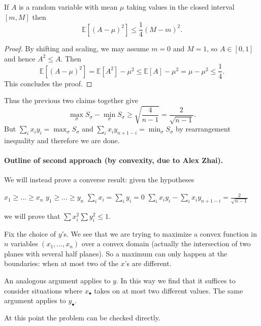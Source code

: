 \documentclass[11pt]{scrartcl}
\begin{document}

\begin{claim*}
  If $A$ is a random variable with mean $\mu$
  taking values in the closed interval $[m, M]$ then
  \[ \mathbb E[(A-\mu)^2] \le \frac14 (M-m)^2. \]
\end{claim*}
\begin{proof}
  By shifting and scaling, we may assume $m = 0$ and $M = 1$,
  so $A \in [0,1]$ and hence $A^2 \le A$.
  Then
  \[
    \mathbb E[(A-\mu)^2]
    = \mathbb E[A^2] - \mu^2
    \le \mathbb E[A] - \mu^2 = \mu-\mu^2 \le \frac14.
  \]
  This concludes the proof.
\end{proof}
Thus the previous two claims together give
\[ \max_\sigma S_\sigma - \min_\sigma S_\sigma
  \ge \sqrt{\frac{4}{n-1}} = \frac{2}{\sqrt{n-1}}.
\]
But $\sum_i x_i y_i = \max_\sigma S_\sigma$
and $\sum_i x_i y_{n+1-i} = \min_\sigma S_\sigma$
by rearrangement inequality
and therefore we are done.

\paragraph{Outline of second approach (by convexity, due to Alex Zhai).}
We will instead prove a converse result: given the hypotheses
\begin{itemize}
  \ii $x_1 \ge \dots \ge x_n$
  \ii $y_1 \ge \dots \ge y_n$
  \ii $\sum_i x_i = \sum_i y_i = 0$
  \ii $\sum_i x_i y_i - \sum_i x_i y_{n+1-i} = \frac{2}{\sqrt{n-1}}$
\end{itemize}
we will prove that $\sum x_i^2 \sum y_i^2 \le 1$.

Fix the choice of $y$'s.
We see that we are trying to maximize a convex function in $n$
variables $(x_1, \dots, x_n)$ over a convex domain
(actually the intersection of two planes with several half planes).
So a maximum can only happen at the boundaries:
when at most two of the $x$'s are different.

An analogous argument applies to $y$.
In this way we find that it suffices to consider situations
where $x_\bullet$ takes on at most two different values.
The same argument applies to $y_\bullet$.

At this point the problem can be checked directly.
\pagebreak
\end{document}
